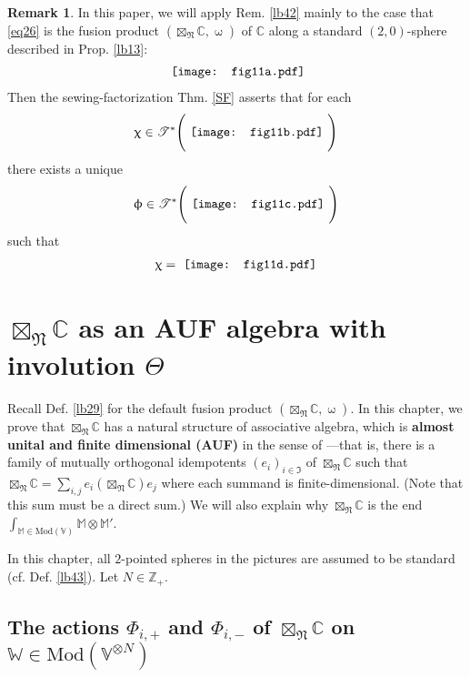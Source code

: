\documentclass[11pt,b5paper,notitlepage]{article}
\theoremstyle{definition}
\newtheorem{rem}[df]{Remark}
\theoremstyle{plain}
\newcommand{\fk}{\mathfrak}
\newcommand{\Vbb}{\mathbb V}
\newcommand{\Wbb}{\mathbb W}
\newcommand{\Mbb}{\mathbb M}
\newcommand{\Cbb}{\mathbb C}
\newcommand{\Zbb}{\mathbb Z}
\newcommand{\<}{\left\langle}
\renewcommand{\>}{\right\rangle}
\newcommand{\ST}{\mathscr{T}}
\newcommand{\Mod}{\mathrm{Mod}}
\newcommand{\fn}{\mathfrak{N}}
\numberwithin{equation}{section}
\begin{document}
\begin{rem}\label{SF1}
In this paper, we will apply Rem. \ref{lb42} mainly to the case that \eqref{eq26} is the fusion product $(\boxtimes_\fn\Cbb,\upomega)$ of $\Cbb$ along a standard $(2,0)$-sphere described in Prop. \ref{lb13}:
\begin{align*}
	\vcenter{\hbox{{
			\texttt{[image: fig11a.pdf]}}}}
\end{align*}
Then the sewing-factorization Thm. \ref{SF} asserts that for each
\begin{align*}
\upchi\in \ST^*\Bigg(\vcenter{\hbox{{
\texttt{[image: fig11b.pdf]}}}}~\Bigg)
	\end{align*}
	there exists a unique 
	\begin{align*}
		\upphi\in \ST^*\Bigg(\vcenter{\hbox{{
		 \texttt{[image: fig11c.pdf]}}}}~\Bigg)
	\end{align*}
such that 
\begin{align*}
\upchi=\vcenter{\hbox{{
\texttt{[image: fig11d.pdf]}}}}
	\end{align*}
\end{rem}






\section{$\boxtimes_\fn\Cbb$ as an AUF algebra with involution $\Theta$}


Recall Def. \ref{lb29} for the default fusion product $(\boxtimes_\fn\Cbb,\upomega)$. In this chapter, we prove that $\boxtimes_\fn\Cbb$ has a natural structure of associative algebra, which is \textbf{almost unital and finite dimensional (AUF)} in the sense of \cite{GZ4}---that is, there is a family of mutually orthogonal idempotents $(e_i)_{i\in\fk I}$ of $\boxtimes_\fn\Cbb$ such that $\boxtimes_\fn\Cbb=\sum_{i,j}e_i(\boxtimes_\fn\Cbb) e_j$ where each summand is finite-dimensional. (Note that this sum must be a direct sum.) We will also explain why $\boxtimes_\fn\Cbb$ is the end $\int_{\Mbb\in\Mod(\Vbb)}\Mbb\otimes\Mbb'$.

In this chapter, all $2$-pointed spheres in the pictures are assumed to be standard (cf. Def. \ref{lb43}). Let $N\in\Zbb_+$.


\subsection{The actions $\Phi_{i,+}$ and $\Phi_{i,-}$ of $\boxtimes_\fn\Cbb$ on $\Wbb\in \Mod(\Vbb^{\otimes N})$}
\end{document}

